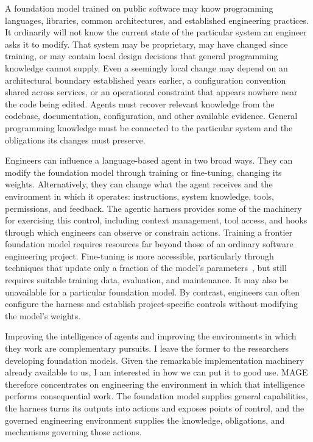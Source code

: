 A foundation model trained on public software may know programming languages, libraries, common architectures, and established engineering practices. It ordinarily will not know the current state of the particular system an engineer asks it to modify. That system may be proprietary, may have changed since training, or may contain local design decisions that general programming knowledge cannot supply. Even a seemingly local change may depend on an architectural boundary established years earlier, a configuration convention shared across services, or an operational constraint that appears nowhere near the code being edited. Agents must recover relevant knowledge from the codebase, documentation, configuration, and other available evidence. General programming knowledge must be connected to the particular system and the obligations its changes must preserve.

Engineers can influence a language-based agent in two broad ways. They can modify the foundation model through training or fine-tuning, changing its weights. Alternatively, they can change what the agent receives and the environment in which it operates: instructions, system knowledge, tools, permissions, and feedback. The agentic harness provides some of the machinery for exercising this control, including context management, tool access, and hooks through which engineers can observe or constrain actions. Training a frontier foundation model requires resources far beyond those of an ordinary software engineering project. Fine-tuning is more accessible, particularly through techniques that update only a fraction of the model's parameters~\citep{hu2022lora}, but still requires suitable training data, evaluation, and maintenance. It may also be unavailable for a particular foundation model. By contrast, engineers can often configure the harness and establish project-specific controls without modifying the model's weights.

Improving the intelligence of agents and improving the environments in which they work are complementary pursuits. I leave the former to the researchers developing foundation models. Given the remarkable implementation machinery already available to us, I am interested in how we can put it to good use. MAGE therefore concentrates on engineering the environment in which that intelligence performs consequential work. The foundation model supplies general capabilities, the harness turns its outputs into actions and exposes points of control, and the governed engineering environment supplies the knowledge, obligations, and mechanisms governing those actions.

